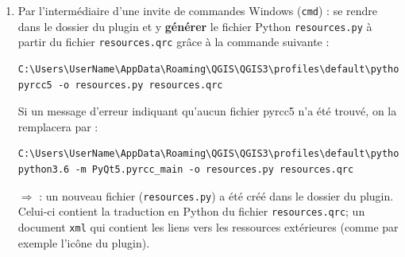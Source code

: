 \documentclass[11pt]{article}
\begin{document}
\begin{enumerate}
\item Par l'intermédiaire d'une invite de commandes Windows (\texttt{cmd}) : se rendre dans le dossier du plugin et y \textbf{générer} le fichier Python \texttt{resources.py} à partir du fichier \texttt{resources.qrc} grâce à la commande suivante : 
\vspace*{-1em}
\begin{center}
\begin{minipage}[t]{0.92\textwidth}
\begin{verbatim}
C:\Users\UserName\AppData\Roaming\QGIS\QGIS3\profiles\default\python\plugins\helloworld>
pyrcc5 -o resources.py resources.qrc
\end{verbatim}
\end{minipage}
\end{center}
\vspace*{1em}

Si un message d'erreur indiquant qu'aucun fichier \og{}pyrcc5\fg{} n'a été trouvé, on la remplacera par :
\vspace*{-1em}
\begin{center}
\begin{minipage}[t]{0.92\textwidth}
\begin{verbatim}
C:\Users\UserName\AppData\Roaming\QGIS\QGIS3\profiles\default\python\plugins\helloworld>
python3.6 -m PyQt5.pyrcc_main -o resources.py resources.qrc
\end{verbatim}
\end{minipage}
\end{center}
\vspace*{1em}






$\Rightarrow$ \underline{}:  un nouveau fichier (\og{}\texttt{resources.py}\fg{}) a été créé dans le dossier du plugin. Celui-ci contient la traduction en Python du fichier \og{}\texttt{resources.qrc}\fg{}; un document \texttt{xml} qui contient les liens vers les ressources extérieures (comme par exemple l'icône du plugin). 


\end{enumerate}
\end{document}

